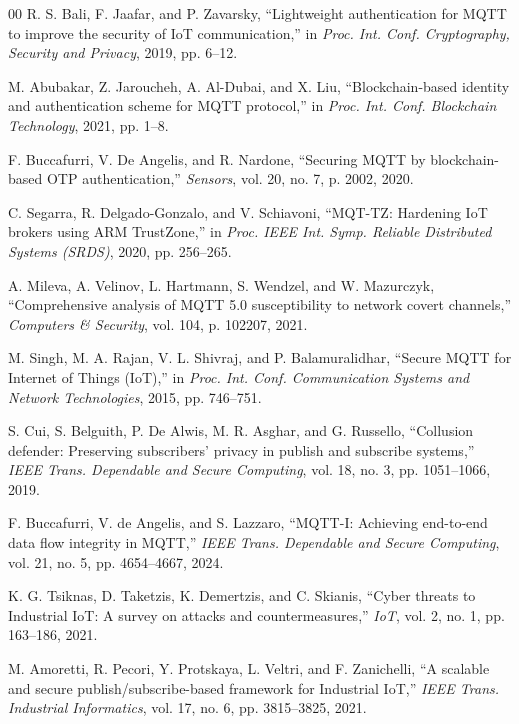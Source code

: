 \documentclass[conference]{IEEEtran}
\begin{document}
\begin{thebibliography}{00}
R. S. Bali, F. Jaafar, and P. Zavarsky, ``Lightweight authentication for MQTT to improve the security of IoT communication,'' in \textit{Proc. Int. Conf. Cryptography, Security and Privacy}, 2019, pp. 6--12.

M. Abubakar, Z. Jaroucheh, A. Al-Dubai, and X. Liu, ``Blockchain-based identity and authentication scheme for MQTT protocol,'' in \textit{Proc. Int. Conf. Blockchain Technology}, 2021, pp. 1--8.

F. Buccafurri, V. De Angelis, and R. Nardone, ``Securing MQTT by blockchain-based OTP authentication,'' \textit{Sensors}, vol. 20, no. 7, p. 2002, 2020.

C. Segarra, R. Delgado-Gonzalo, and V. Schiavoni, ``MQT-TZ: Hardening IoT brokers using ARM TrustZone,'' in \textit{Proc. IEEE Int. Symp. Reliable Distributed Systems (SRDS)}, 2020, pp. 256--265.

A. Mileva, A. Velinov, L. Hartmann, S. Wendzel, and W. Mazurczyk, ``Comprehensive analysis of MQTT 5.0 susceptibility to network covert channels,'' \textit{Computers \& Security}, vol. 104, p. 102207, 2021.

M. Singh, M. A. Rajan, V. L. Shivraj, and P. Balamuralidhar, ``Secure MQTT for Internet of Things (IoT),'' in \textit{Proc. Int. Conf. Communication Systems and Network Technologies}, 2015, pp. 746--751.

S. Cui, S. Belguith, P. De Alwis, M. R. Asghar, and G. Russello, ``Collusion defender: Preserving subscribers' privacy in publish and subscribe systems,'' \textit{IEEE Trans. Dependable and Secure Computing}, vol. 18, no. 3, pp. 1051--1066, 2019.

F. Buccafurri, V. de Angelis, and S. Lazzaro, ``MQTT-I: Achieving end-to-end data flow integrity in MQTT,'' \textit{IEEE Trans. Dependable and Secure Computing}, vol. 21, no. 5, pp. 4654--4667, 2024.

K. G. Tsiknas, D. Taketzis, K. Demertzis, and C. Skianis, ``Cyber threats to Industrial IoT: A survey on attacks and countermeasures,'' \textit{IoT}, vol. 2, no. 1, pp. 163--186, 2021.

M. Amoretti, R. Pecori, Y. Protskaya, L. Veltri, and F. Zanichelli, ``A scalable and secure publish/subscribe-based framework for Industrial IoT,'' \textit{IEEE Trans. Industrial Informatics}, vol. 17, no. 6, pp. 3815--3825, 2021.


\end{thebibliography}
\end{document}
